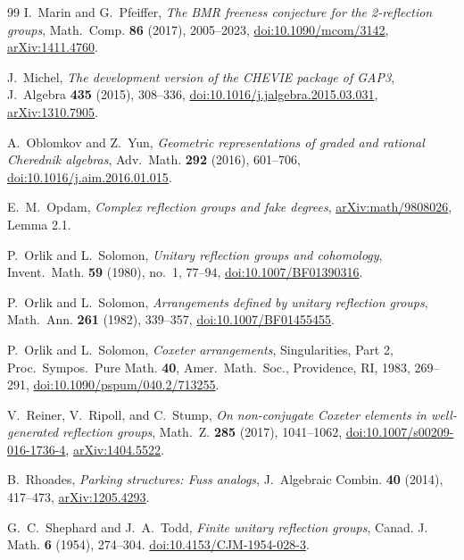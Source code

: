 \documentclass[11pt]{amsart}
\theoremstyle{definition}
\begin{document}
\begin{thebibliography}{99}
I.~Marin and G.~Pfeiffer,
\emph{The BMR freeness conjecture for the 2-reflection groups},
Math.~Comp. \textbf{86} (2017), 2005--2023,
\href{https://doi.org/10.1090/mcom/3142}{doi:10.1090/mcom/3142},
\href{https://arxiv.org/abs/1411.4760}{arXiv:1411.4760}.

J.~Michel,
\emph{The development version of the CHEVIE package of GAP3},
J.~Algebra \textbf{435} (2015), 308--336,
\href{https://doi.org/10.1016/j.jalgebra.2015.03.031}{doi:10.1016/j.jalgebra.2015.03.031},
\href{https://arxiv.org/abs/1310.7905}{arXiv:1310.7905}.

A.~Oblomkov and Z.~Yun,
\emph{Geometric representations of graded and rational Cherednik algebras},
Adv.~Math. \textbf{292} (2016), 601--706,
\href{https://doi.org/10.1016/j.aim.2016.01.015}{doi:10.1016/j.aim.2016.01.015}.

E.~M.~Opdam,
\emph{Complex reflection groups and fake degrees},
\href{https://arxiv.org/abs/math/9808026}{arXiv:math/9808026}, Lemma 2.1.

P.~Orlik and L.~Solomon,
\emph{Unitary reflection groups and cohomology},
Invent.~Math. \textbf{59} (1980), no.~1, 77--94,
\href{https://doi.org/10.1007/BF01390316}{doi:10.1007/BF01390316}.

P.~Orlik and L.~Solomon,
\emph{Arrangements defined by unitary reflection groups},
Math.~Ann. \textbf{261} (1982), 339--357,
\href{https://doi.org/10.1007/BF01455455}{doi:10.1007/BF01455455}.

P.~Orlik and L.~Solomon,
\emph{Coxeter arrangements},
Singularities, Part 2, Proc.~Sympos.~Pure Math. \textbf{40},
Amer.~Math.~Soc., Providence, RI, 1983, 269--291,
\href{https://doi.org/10.1090/pspum/040.2/713255}{doi:10.1090/pspum/040.2/713255}.

V.~Reiner, V.~Ripoll, and C.~Stump,
\emph{On non-conjugate Coxeter elements in well-generated reflection groups},
Math.~Z. \textbf{285} (2017), 1041--1062,
\href{https://doi.org/10.1007/s00209-016-1736-4}{doi:10.1007/s00209-016-1736-4},
\href{https://arxiv.org/abs/1404.5522}{arXiv:1404.5522}.

B.~Rhoades, \emph{Parking structures: Fuss analogs},
J.~Algebraic Combin. \textbf{40} (2014), 417--473,
\href{https://arxiv.org/abs/1205.4293}{arXiv:1205.4293}.

G.~C.~Shephard and J.~A.~Todd,
\emph{Finite unitary reflection groups},
Canad. J. Math. \textbf{6} (1954), 274--304.
\href{https://doi.org/10.4153/CJM-1954-028-3}{doi:10.4153/CJM-1954-028-3}.


\end{thebibliography}
\end{document}
